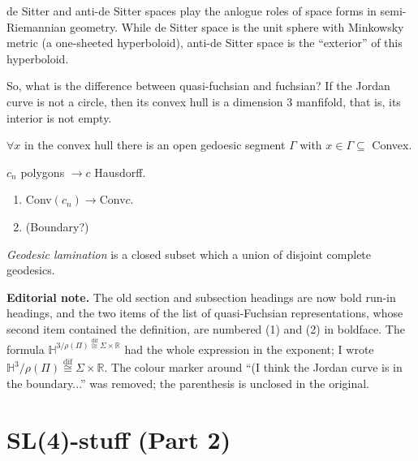 \begin{remark}
\label{remark-smith-ds-ads}
de Sitter and anti-de Sitter spaces play the
anlogue roles of space forms in
semi-Riemannian geometry. While de Sitter
space is the unit sphere with Minkowsky
metric (a one-sheeted hyperboloid), anti-de
Sitter space is the ``exterior'' of this
hyperboloid.
\end{remark}

So, what is the difference between
quasi-fuchsian and fuchsian? If the Jordan
curve is not a circle, then its convex hull
is a dimension 3 manfifold, that is, its
interior is not empty.

\begin{remark}[l.e.p.]
\label{remark-smith-lep}
$\forall x$ in the convex hull there is an
open gedoesic segment $\Gamma$ with
$x\in\Gamma\subseteq$ Convex.
\end{remark}

\begin{exercise}
\label{exercise-smith-polygons}
$c_n$ polygons $\longrightarrow c$ Hausdorff.
\begin{enumerate}
\item Conv$(c_n)\longrightarrow $Conv$c$.
\item (Boundary?)
\end{enumerate}
\end{exercise}

\begin{definition}
\label{definition-smith-lamination}
\textit{Geodesic lamination} is a closed
subset which a union of disjoint complete
geodesics.
\end{definition}

\medskip\noindent
{\bf Editorial note.}
The old section and subsection headings are
now bold run-in headings, and the two items
of the list of quasi-Fuchsian
representations, whose second item contained
the definition, are numbered (1) and (2) in
boldface. The formula
$\mathbb{H}^{3/\rho(\Pi)\overset
{\operatorname{dif}}{\cong}
\Sigma\times \mathbb{R}}$ had the whole
expression in the exponent; I wrote
$\mathbb{H}^{3}/\rho(\Pi)
\overset{\operatorname{dif}}{\cong
} \Sigma\times \mathbb{R}$. The colour marker
around ``(I think the Jordan curve is in the
boundary...'' was removed; the parenthesis is
unclosed in the original.


\section{SL(4)-stuff (Part 2)}
\label{section-smith-sl4-stuff-2}

